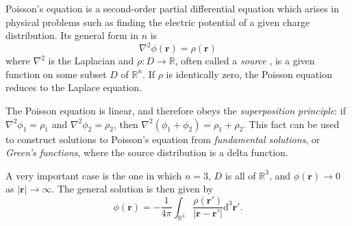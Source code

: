 \documentclass[12pt]{article}
\begin{document}

Poisson's equation is a second-order partial differential equation which arises in physical problems such as finding the electric potential of a given charge distribution.  Its general form in $n$  is
$$
\nabla^2\phi(\mathbf r)=\rho(\mathbf r)
$$
where $\nabla^2$ is the Laplacian and $\rho:D\to\mathbb{R}$, often called a \emph{source }, is a given function on some subset $D$ of $\mathbb{R}^n$.  If $\rho$ is identically zero, the Poisson equation reduces to the Laplace equation.

The Poisson equation is linear, and therefore obeys the \emph{superposition principle}: if $\nabla^2\phi_1=\rho_1$ and $\nabla^2\phi_2=\rho_2$, then $\nabla^2(\phi_1+\phi_2)=\rho_1+\rho_2$.  This fact can be used to construct solutions to Poisson's equation from \emph{fundamental solutions}, or \emph{Green's functions}, where the source distribution is a delta function.

A very important case is the one in which $n=3$, $D$ is all of $\mathbb{R}^3$, and $\phi(\mathbf r)\to 0$ as $\vert\mathbf r\vert\to\infty$.  The general solution is then given by
$$
\phi(\mathbf r)=-\frac{1}{4\pi}\int_{\mathbb{R}^3}\frac{\rho(\mathbf{r'})}{\vert\mathbf{r}-\mathbf{r'}\vert}\mathrm{d}^3\mathbf{r'}.
$$
\end{document}
